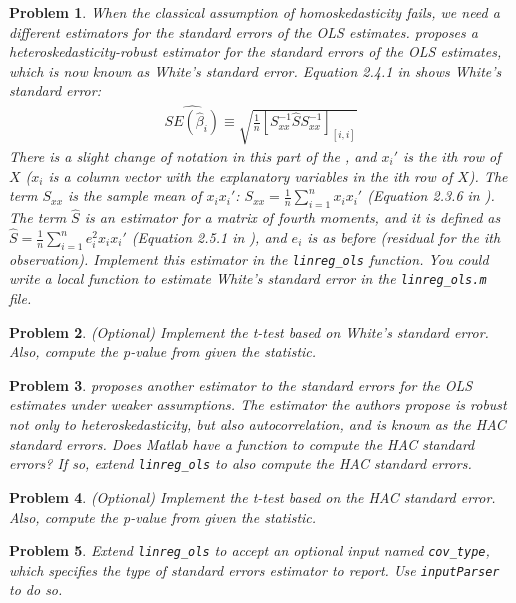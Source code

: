 \documentclass[12pt, a4paper]{article}
\newtheorem{problem}{Problem}
\begin{document}
\begin{problem}
When the classical assumption of homoskedasticity fails, we need a different estimators for the standard errors of the OLS estimates.
\citet{W1980} proposes a heteroskedasticity-robust estimator for the standard errors of the OLS estimates, which is now known as White's standard error.
Equation 2.4.1 in \citet{H2000} shows White's standard error:
\begin{align*}
\widehat{SE(\hat{\beta}_i)}\equiv\sqrt{\frac{1}{n}[S_{xx}^{-1}\hat{S}S_{xx}^{-1}]_{[i,i]}}
\end{align*}
There is a slight change of notation in this part of the \citet{H2000}, and \(x_i'\) is the ith row of \(X\) (\(x_i\) is a column vector with the explanatory variables in the ith row of \(X\)).
The term \(S_{xx}\) is the sample mean of \(x_ix_i'\): \(S_{xx}=\frac{1}{n}\sum_{i=1}^nx_ix_i'\) (Equation 2.3.6 in \citet{H2000}).
The term \(\hat{S}\) is an estimator for a matrix of fourth moments, and it is defined as \(\hat{S}=\frac{1}{n}\sum_{i=1}^ne_i^2x_ix_i'\) (Equation 2.5.1 in \citet{H2000}), and \(e_i\) is as before (residual for the ith observation).
Implement this estimator in the \texttt{linreg\_ols} function.
You could write a local function to estimate White's standard error in the \texttt{linreg\_ols.m} file.
\end{problem}

\begin{problem}
(Optional) Implement the t-test based on White's standard error. Also, compute the p-value from given the statistic.
\end{problem}

\begin{problem}
\citet{NW1987} proposes another estimator to the standard errors for the OLS estimates under weaker assumptions.
The estimator the authors propose is robust not only to heteroskedasticity, but also autocorrelation, and is known as the HAC standard errors.
Does Matlab have a function to compute the HAC standard errors?
If so, extend \texttt{linreg\_ols} to also compute the HAC standard errors.
\end{problem}

\begin{problem}
(Optional) Implement the t-test based on the HAC standard error. Also, compute the p-value from given the statistic.
\end{problem}

\begin{problem}
Extend \texttt{linreg\_ols} to accept an optional input named \texttt{cov\_type}, which specifies the type of standard errors estimator to report.
Use \texttt{inputParser} to do so.
\end{problem}
\newpage
\printbibliography
\newpage
\end{document}
